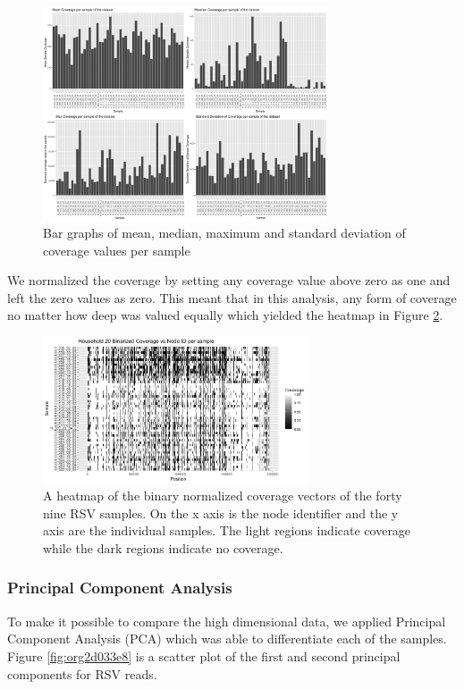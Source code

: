 \documentclass[10pt, a4paper]{article}
\begin{document}
\begin{figure}[h]
\centering
\includegraphics[width=0.75\textwidth]{../Figures/RSV/structure_of_coverage_data.png}
\caption[RSV Structure of the Data]{\label{fig:orgb1c0856}Bar graphs of mean, median, maximum and standard deviation of coverage values per sample}
\end{figure}


We normalized the coverage by setting any coverage value above zero as one and 
left the zero values as zero. This meant that in this analysis, any form of
coverage no matter how deep was valued equally which yielded the heatmap in
Figure \ref{fig:orgd07bd04}.

\begin{figure}[h!]
\centering
\includegraphics[width=0.7\textwidth]{../Figures/RSV/Heatmap.png}
\caption[RSV heatmap]{\label{fig:orgd07bd04}A heatmap of the binary normalized coverage vectors of the forty nine RSV samples. On the x axis is the node identifier and the y axis are the individual samples. The light regions indicate coverage while the dark regions indicate no coverage.}
\end{figure}

\newpage
\subsubsection{Principal Component Analysis}
\label{sec:org39e39b3}
To make it possible to compare the high dimensional data, we applied Principal 
Component Analysis (PCA) which was able to differentiate each of the samples.
Figure \ref{fig:org2d033e8} is a scatter plot of the first and second principal 
components for RSV reads.
\end{document}
